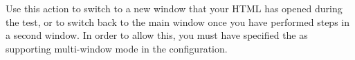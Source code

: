 
Use this action to switch to a new window that your HTML \gdaut{} has opened during the test, or to switch back to the main window once you have performed steps in a second window. In order to allow this, you must have specified the \gdaut{} as supporting multi-window mode in the \gdaut{} configuration. 
